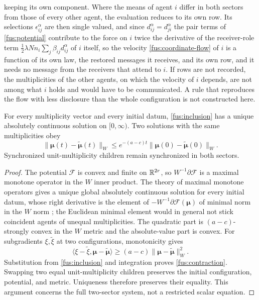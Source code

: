 keeping its own component. Where the means of agent $i$ differ in both
sectors from those of every other agent, the evaluation reduces to its own
row. Its selections $\epsilon_{ij}^\alpha$ are then single valued, and since
$d_{ij}^\alpha=d_{ji}^\alpha$ the pair terms of \cref{fus:potential}
contribute to the force on $i$ twice the derivative of the receiver-role
term $\tfrac12\lambda Nn_i\sum_j\beta_{ij}d_{ij}^\alpha$ of $i$ itself, so
the velocity \cref{fus:coordinate-flow} of $i$ is a function of its own
law, the restored messages it receives, and its own row, and it needs no
message from the receivers that attend to $i$. If rows are not recorded, the
multiplicities of the other agents, on which the velocity of $i$ depends, are
not among what $i$ holds and would have to be communicated. A rule that
reproduces the flow with less disclosure than the whole configuration is not
constructed here.

For every multiplicity vector and every initial datum, \cref{fus:inclusion}
has a unique absolutely continuous solution on $[0,\infty)$. Two solutions
with the same multiplicities obey
\begin{equation}
 \|\boldsymbol\mu(t)-\widetilde{\boldsymbol\mu}(t)\|_W
 \leq e^{-(a-c)t}
 \|\boldsymbol\mu(0)-\widetilde{\boldsymbol\mu}(0)\|_W.
 \label{fus:contraction}
\end{equation}
Synchronized unit-multiplicity children remain synchronized in both sectors.
\begin{proof}
The potential $\mathcal F$ is convex and finite on $\mathbb R^{2r}$, so
$W^{-1}\partial\mathcal F$ is a maximal monotone operator in the $W$ inner
product. The theory of maximal monotone operators gives a unique global
absolutely continuous solution for every initial datum, whose right
derivative is the element of $-W^{-1}\partial\mathcal F(\boldsymbol\mu)$ of
minimal norm in the $W$ norm \cite{Brezis1973}; the Euclidean minimal
element would in general not stick coincident agents of unequal
multiplicities. The quadratic part is $(a-c)$-strongly convex in the $W$
metric and the absolute-value part is convex. For subgradients
$\xi,\widetilde\xi$ at two configurations, monotonicity gives
\begin{equation}
 \langle\xi-\widetilde\xi,
 \boldsymbol\mu-\widetilde{\boldsymbol\mu}\rangle
 \geq(a-c)\|\boldsymbol\mu-\widetilde{\boldsymbol\mu}\|_W^2.
\end{equation}
Substitution from \cref{fus:inclusion} and integration proves
\cref{fus:contraction}. Swapping two equal unit-multiplicity children
preserves the initial configuration, potential, and metric. Uniqueness
therefore preserves their equality. This argument concerns the full
two-sector system, not a restricted scalar equation.
\end{proof}

